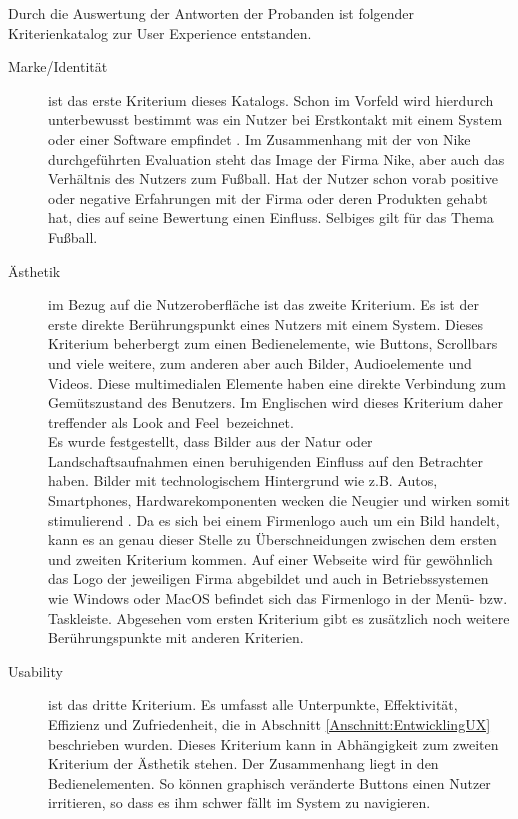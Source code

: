 Durch die Auswertung der Antworten der Probanden ist folgender Kriterienkatalog zur User Experience entstanden. \\
\begin{description} 
\item[Marke/Identität] ist das erste Kriterium dieses Katalogs. Schon im Vorfeld wird hierdurch unterbewusst bestimmt was ein Nutzer bei Erstkontakt mit einem System oder einer Software empfindet \cite[S. 12 \& S. 17f.]{Gutjahr:2013gi}. 
Im Zusammenhang mit der von Nike durchgeführten Evaluation steht das Image der Firma Nike, aber auch das Verhältnis des Nutzers zum Fußball. Hat der Nutzer schon vorab positive oder negative Erfahrungen mit der Firma oder deren Produkten gehabt hat, dies auf seine Bewertung einen Einfluss. Selbiges gilt für das Thema Fußball. \cite[S. 71]{Hartmann:2006vx} 
\item[Ästhetik] im Bezug auf die Nutzeroberfläche ist das zweite Kriterium. Es ist der erste direkte Berührungspunkt eines Nutzers mit einem System. Dieses Kriterium beherbergt zum einen Bedienelemente, wie Buttons, Scrollbars und viele weitere, zum anderen aber auch Bilder, Audioelemente und Videos. Diese multimedialen Elemente haben eine direkte Verbindung zum Gemütszustand des Benutzers. Im Englischen wird dieses Kriterium daher treffender als \glqq Look and Feel\grqq\ bezeichnet. \\
Es wurde festgestellt, dass Bilder aus der Natur oder Landschaftsaufnahmen einen beruhigenden Einfluss auf den Betrachter haben. Bilder mit technologischem Hintergrund wie z.B. Autos, Smartphones, Hardwarekomponenten wecken die Neugier und wirken somit stimulierend \cite[S. 2]{Sutcliffe:2002fs}. Da es sich bei einem Firmenlogo auch um ein Bild handelt, kann es an genau dieser Stelle zu Überschneidungen zwischen dem ersten und zweiten Kriterium kommen. Auf einer Webseite wird für gewöhnlich das Logo der jeweiligen Firma abgebildet und auch in Betriebssystemen wie Windows oder MacOS befindet sich das Firmenlogo in der Menü- bzw. Taskleiste. Abgesehen vom ersten Kriterium gibt es zusätzlich noch weitere Berührungspunkte mit anderen Kriterien. \cite[S. 71]{Hartmann:2006vx}
\item[Usability] ist das dritte Kriterium. Es umfasst alle Unterpunkte, Effektivität, Effizienz und Zufriedenheit, die in Abschnitt \ref{Anschnitt:EntwicklingUX} beschrieben wurden. Dieses Kriterium kann in Abhängigkeit zum zweiten Kriterium der Ästhetik stehen. Der Zusammenhang liegt in den Bedienelementen. So können graphisch veränderte Buttons einen Nutzer irritieren, so dass es ihm schwer fällt im System zu navigieren. \cite[S. 71]{Hartmann:2006vx}

\end{description}
